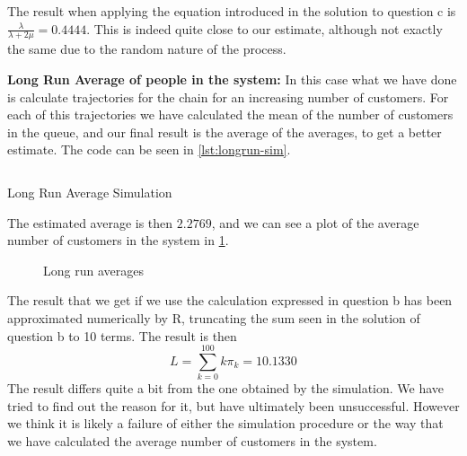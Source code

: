 \documentclass[11pt, a4paper]{article}
\begin{document}
The result when applying the equation introduced in the solution to question c is $\frac{\lambda}{\lambda + 2\mu} = 0.4444$. This is indeed quite close to our estimate, although not exactly the same due to the random nature of the process.

\textbf{Long Run Average of people in the system:}
In this case what we have done is calculate trajectories for the chain for an increasing number of customers. For each of this trajectories we have calculated the mean of the number of customers in the queue, and our final result is the average of the averages, to get a better estimate. The code can be seen in \cref{lst:longrun-sim}.
\begin{listing}[H]
	\inputminted[firstline = 203, lastline = 209]{R}{../main.R}
	\caption{Long Run Average Simulation}
	\label{lst:longrun-sim}
\end{listing}
The estimated average is then $2.2769$, and we can see a plot of the average number of customers in the system in \cref{fig:lravg}.
\begin{figure}[H]
	\centering
	
	\caption{Long run averages}
	\label{fig:lravg}
\end{figure}

The result that we get if we use the calculation expressed in question b has been approximated numerically by R, truncating the sum seen in the solution of question b to 10 terms. The result is then
\[
	L = \sum_{k = 0}^{100} k \pi_k = 10.1330
\]
The result differs quite a bit from the one obtained by the simulation. We have tried to find out the reason for it, but have ultimately been unsuccessful. 
However we think it is likely a failure of either the simulation procedure or the way that we have calculated the average number of customers in the system. 

\printbibliography
\end{document}
